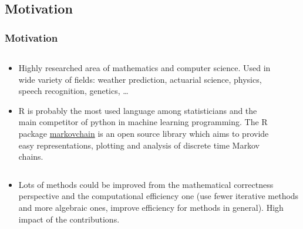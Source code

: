 \subsection{Motivation}
\begin{frame}\frametitle{Motivation}
 \begin{columns}
 \begin{column}{0.5\textwidth}
  \begin{itemize}
   \item Highly researched area of mathematics and computer science. Used in 
   wide variety of fields: weather prediction, actuarial science, physics,
   speech recognition, genetics, \ldots
   \item R is probably the most used language among statisticians and the main 
   competitor of python in machine learning programming. The R package 
   \href{https://github.com/spedygiorgio/markovchain}{markovchain} is an 
   open source library which aims to provide easy representations, plotting 
   and analysis of discrete time Markov chains.
  \end{itemize}
 \end{column}
 
 \begin{column}{0.4\textwidth}
   \begin{figure}[htbp]
  \centering
  
  \end{figure}
 \end{column}
\end{columns}
 
 \begin{columns}
  \begin{column}{\textwidth}
  \begin{itemize}
  \item Lots of methods could be improved from the mathematical correctness perspective
   and the computational efficiency one (use fewer iterative methods and more algebraic 
   ones, improve efficiency for methods in general). High impact of the contributions.
  \end{itemize}
  \end{column}
 \end{columns}
\end{frame}

